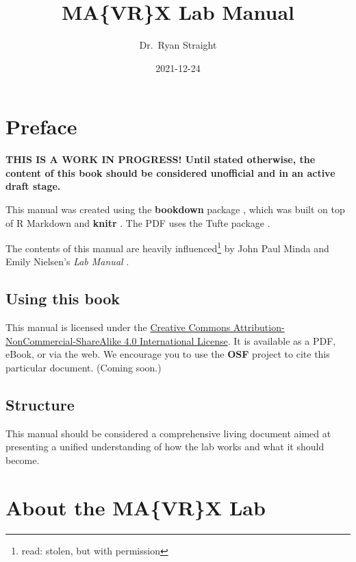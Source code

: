 \documentclass[]{tufte-book}
\title{MA\{VR\}X Lab Manual}
\author{Dr.~Ryan Straight}
\date{2021-12-24}
\begin{document}
\maketitle



{
\hypersetup{linkcolor=black}
\setcounter{tocdepth}{1}
\tableofcontents
}
\listoftables
\listoffigures

\hypertarget{preface}{%
\chapter*{Preface}\label{preface}}

\textbf{THIS IS A WORK IN PROGRESS! Until stated otherwise, the content of this book should be considered unofficial and in an active draft stage.}

This manual was created using the \textbf{bookdown} package \citep{R-bookdown}, which was built on top of R Markdown and \textbf{knitr} \citep{xie2015}. The PDF uses the Tufte package \citep{xieTufteTufteStyles2021}.

The contents of this manual are heavily influenced\footnote{read: stolen, but with permission} by John Paul Minda and Emily Nielsen's \emph{Lab Manual} \citeyearpar{Minda_Nielsen_2018}.

\hypertarget{using-this-book}{%
\section*{Using this book}\label{using-this-book}}

This manual is licensed under the \href{http://creativecommons.org/licenses/by-nc-sa/4.0/}{Creative Commons Attribution-NonCommercial-ShareAlike 4.0 International License}. It is available as a PDF, eBook, or via the web. We encourage you to use the \textbf{OSF} project to cite this particular document. (Coming soon.)

\hypertarget{structure}{%
\section*{Structure}\label{structure}}

This manual should be considered a comprehensive living document aimed at presenting a unified understanding of how the lab works and what it should become.

\hypertarget{about-the-mavrx-lab}{%
\chapter*{About the MA\{VR\}X Lab}\label{about-the-mavrx-lab}}
\end{document}

